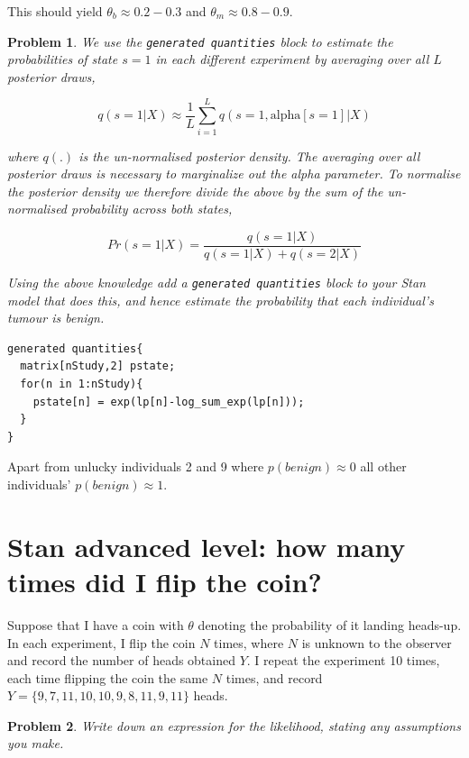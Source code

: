 \documentclass{article}
\newtheorem{problem}{Problem}[section]
\begin{document}
This should yield $\theta_b\approx 0.2-0.3$ and $\theta_m \approx 0.8-0.9$.

\begin{problem}
	We use the \texttt{generated quantities} block to estimate the probabilities of state $s=1$ in each different experiment by averaging over all $L$ posterior draws,
	
	\begin{equation}
	q(s=1|X) \approx \frac{1}{L} \sum_{i=1}^{L} q(s=1,\text{alpha}[s=1]|X)
	\end{equation}
	
	where $q(.)$ is the un-normalised posterior density. The averaging over all posterior draws is necessary to marginalize out the alpha parameter. To normalise the posterior density we therefore divide the above by the sum of the un-normalised probability across both states,
	
	\begin{equation}
	Pr(s=1|X) = \frac{q(s=1|X)}{q(s=1|X)+q(s=2|X)}
	\end{equation} 
	
	Using the above knowledge add a \texttt{generated quantities} block to your Stan model that does this, and hence estimate the probability that each individual's tumour is benign.
\end{problem}

\begin{verbatim}
generated quantities{
  matrix[nStudy,2] pstate;
  for(n in 1:nStudy){
    pstate[n] = exp(lp[n]-log_sum_exp(lp[n]));
  }
}
\end{verbatim}

Apart from unlucky individuals 2 and 9 where $p(benign)\approx 0$ all other individuals' $p(benign)\approx 1$.


\section{Stan advanced level: how many times did I flip the coin?}
Suppose that I have a coin with $\theta$ denoting the probability of it landing heads-up. In each experiment, I flip the coin $N$ times, where $N$ is unknown to the observer and record the number of heads obtained $Y$. I repeat the experiment 10 times, each time flipping the coin the same $N$ times, and record $Y=\{9,7,11,10,10,9,8,11,9,11\}$ heads.

\begin{problem}
	Write down an expression for the likelihood, stating any assumptions you make.
\end{problem}
\end{document}
